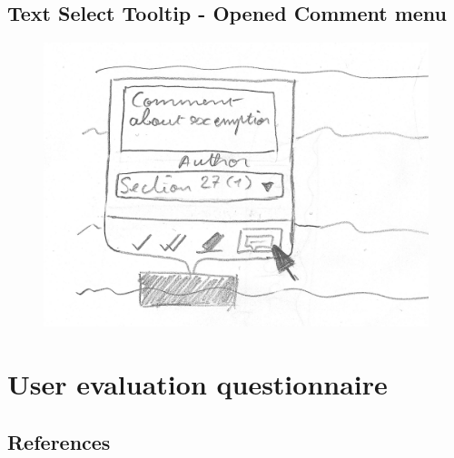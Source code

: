 \documentclass[\version]{l4proj}
\begin{document}
\begin{appendices}
    \section{Text Select Tooltip - Opened Comment menu}
    \begin{figure}[H]
        \centering
        \includegraphics[width=\linewidth]{images/wireframes/tooltip_comment.jpg}
    \end{figure}
    \chapter{User evaluation questionnaire}\label{appendix:questionnaire}
    
\end{appendices}


\newpage


\section*{References}

\printbibliography[heading=none]

\vspace*{\fill}
\doclicenseThis
\end{document}
